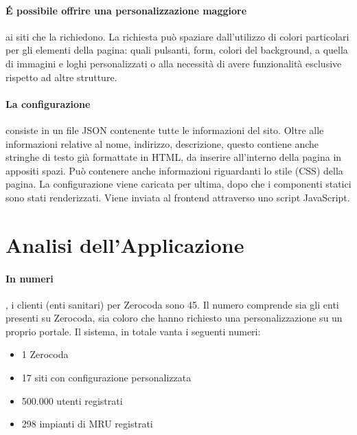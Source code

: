 \paragraph{É possibile offrire una  personalizzazione maggiore} ai siti che la richiedono. La richiesta può spaziare dall'utilizzo di colori particolari per gli elementi della pagina: quali pulsanti, form, colori del background, a quella di immagini e loghi personalizzati o alla necessità di avere funzionalità esclusive rispetto ad altre strutture.

\paragraph{La configurazione} consiste in un file JSON contenente tutte le informazioni del sito. Oltre alle informazioni relative al nome, indirizzo, descrizione, questo contiene anche stringhe di testo già formattate in HTML, da inserire all'interno della pagina in appositi spazi. Può contenere anche informazioni riguardanti lo stile (CSS) della pagina. La configurazione viene caricata per ultima, dopo che i componenti statici sono stati renderizzati. Viene inviata al frontend attraverso uno script JavaScript.

\section{Analisi dell'Applicazione}
\paragraph{In numeri}, i clienti (enti sanitari) per Zerocoda sono 45. Il numero comprende sia gli enti presenti su Zerocoda, sia coloro che hanno richiesto una personalizzazione su un proprio portale. Il sistema, in totale vanta i seguenti numeri:
\begin{itemize}
    \item 1 Zerocoda
    \item 17 siti con configurazione personalizzata
    \item 500.000 utenti registrati
    \item 298 impianti di MRU registrati
\end{itemize}


